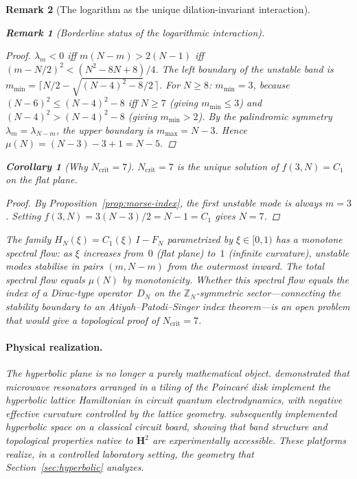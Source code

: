 \documentclass[12pt, a4paper]{article}
\newtheorem{corollary}[theorem]{Corollary}
\newtheorem{remark}{Remark}[section]
\numberwithin{equation}{section}
\begin{document}
\begin{remark}[The logarithm as the unique dilation-invariant interaction]
\begin{remark}[Borderline status of the logarithmic interaction]
\begin{proof}
$\lambda_m < 0$ iff $m(N{-}m) > 2(N{-}1)$ iff
$(m - N/2)^2 < (N^2 - 8N + 8)/4$.  The left boundary of the
unstable band is $m_{\min} = \lceil N/2 - \sqrt{(N{-}4)^2 - 8}/2\,\rceil$.
For $N \ge 8$: $m_{\min} = 3$, because
$(N{-}6)^2 \le (N{-}4)^2 - 8$ iff $N \ge 7$
(giving $m_{\min} \le 3$) and
$(N{-}4)^2 > (N{-}4)^2 - 8$
(giving $m_{\min} > 2$).
By the palindromic symmetry $\lambda_m = \lambda_{N-m}$, the
upper boundary is $m_{\max} = N - 3$.
Hence $\mu(N) = (N{-}3) - 3 + 1 = N - 5$.
\end{proof}

\begin{corollary}[Why $N_{\mathrm{crit}} = 7$]
\label{cor:why-7}
$N_{\mathrm{crit}} = 7$ is the unique solution of $f(3, N) = C_1$
on the flat plane.
\end{corollary}
\begin{proof}
By Proposition~\ref{prop:morse-index}, the first unstable mode is
always $m = 3$.  Setting $f(3, N) = 3(N{-}3)/2 = N{-}1 = C_1$ gives
$N = 7$.
\end{proof}

The family $H_N(\xi) = C_1(\xi)\,I - F_N$ parametrized by
$\xi \in [0, 1)$ has a monotone spectral flow: as $\xi$
increases from~$0$ (flat plane) to~$1$ (infinite curvature),
unstable modes stabilise in pairs $(m, N{-}m)$ from the outermost
inward.  The total spectral flow equals $\mu(N)$ by monotonicity.
Whether this spectral flow equals the index of a Dirac-type
operator~$D_N$ on the $\mathbb{Z}_N$-symmetric
sector---connecting the stability boundary to an
Atiyah--Patodi--Singer index theorem---is an open problem that
would give a topological proof of $N_{\mathrm{crit}} = 7$.

\paragraph{Physical realization.}
The hyperbolic plane is no longer a purely mathematical object.
\citet{Kollar2019} demonstrated that microwave resonators arranged in
a tiling of the Poincar\'e disk implement the hyperbolic lattice
Hamiltonian in circuit quantum electrodynamics, with negative
effective curvature controlled by the lattice geometry.
\citet{Lenggenhager2022} subsequently implemented hyperbolic space
on a classical circuit board, showing that band structure and
topological properties native to $\mathbf{H}^2$ are experimentally
accessible.  These platforms realize, in a controlled laboratory
setting, the geometry that Section~\ref{sec:hyperbolic} analyzes.


\end{remark}
\end{remark}
\end{document}
